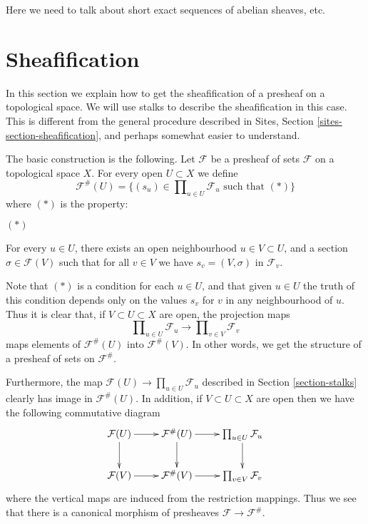 \noindent
Here we need to talk about short exact sequences of abelian sheaves, etc.




\section{Sheafification}
\label{section-sheafification}

\noindent
In this section we explain how to get the sheafification
of a presheaf on a topological space. We will use stalks
to describe the sheafification in this case. This is different
from the general procedure described in Sites, Section
\ref{sites-section-sheafification}, and perhaps somewhat
easier to understand.

\medskip\noindent
The basic construction is the following. Let $\mathcal{F}$ be a presheaf
of sets $\mathcal{F}$ on a topological space $X$.
For every open $U \subset X$ we define
$$
\mathcal{F}^{\#}(U)
=
\{
(s_u) \in \prod\nolimits_{u \in U} \mathcal{F}_u
\text{ such that }(*)
\}
$$
where $(*)$ is the property:
\begin{list}{$(*)$}{}
\item For every $u \in U$, there exists an open neighbourhood
$u \in V \subset U$, and a section $\sigma \in \mathcal{F}(V)$
such that for all $v \in V$ we have $s_v = (V, \sigma)$
in $\mathcal{F}_v$.
\end{list}
Note that $(*)$ is a condition for each $u \in U$,
and that given $u \in U$ the truth of this condition
depends only on the values $s_v$ for $v$ in any neighbourhood
of $u$. Thus it is clear that,
if $V \subset U \subset X$ are open, the projection maps
$$
\prod\nolimits_{u \in U} \mathcal{F}_u
\longrightarrow
\prod\nolimits_{v \in V} \mathcal{F}_v
$$
maps elements of $\mathcal{F}^{\#}(U)$ into $\mathcal{F}^{\#}(V)$.
In other words, we get the structure of a presheaf of sets
on $\mathcal{F}^{\#}$. 

\medskip\noindent
Furthermore, the map $\mathcal{F}(U) \to \prod_{u \in U} \mathcal{F}_u$
described in Section \ref{section-stalks} clearly has image
in $\mathcal{F}^{\#}(U)$. In addition, if $V \subset U \subset X$ are
open then we have the following commutative diagram
$$
\xymatrix{
\mathcal{F}(U) \ar[r] \ar[d] &
\mathcal{F}^{\#}(U) \ar[r] \ar[d] &
\prod_{u\in U} \mathcal{F}_u \ar[d]\cr
\mathcal{F}(V) \ar[r] &
\mathcal{F}^{\#}(V) \ar[r] &
\prod_{v\in V} \mathcal{F}_v
}
$$
where the vertical maps are induced from the
restriction mappings. Thus we see that
there is a canonical morphism of presheaves
$\mathcal{F} \to \mathcal{F}^{\#}$.

